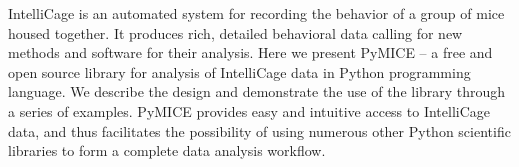 IntelliCage is an automated system for recording the behavior of a group of mice 
housed together. It produces rich, detailed behavioral data calling for new 
methods and software for their analysis. Here we present PyMICE -- a free and open source
library for analysis of IntelliCage data in Python programming language. 
We describe the design and demonstrate the use of the library through 
a series of examples.  PyMICE provides easy and intuitive 
access to IntelliCage data, and thus facilitates the possibility of using 
numerous other Python scientific libraries to form a complete data analysis workflow.
